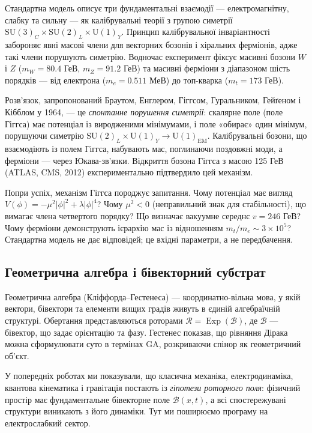 \documentclass[11pt,a4paper]{article}
\newcommand{\Exp}{\operatorname{Exp}}
\newcommand{\Rotor}{\mathcal{R}}
\newcommand{\Biv}{\mathcal{B}}
\newcommand{\SU}{\mathrm{SU}}
\newcommand{\UU}{\mathrm{U}}
\theoremstyle{definition}
\theoremstyle{plain}
\theoremstyle{remark}
\begin{document}
Стандартна модель описує три фундаментальні взаємодії — електромагнітну, слабку та сильну — як калібрувальні теорії з групою симетрії $\SU(3)_C \times \SU(2)_L \times \UU(1)_Y$. Принцип калібрувальної інваріантності забороняє явні масові члени для векторних бозонів і хіральних ферміонів, адже такі члени порушують симетрію. Водночас експеримент фіксує масивні бозони $W$ і $Z$ ($m_W = 80{.}4$ ГеВ, $m_Z = 91{.}2$ ГеВ) та масивні ферміони з діапазоном шість порядків — від електрона ($m_e = 0{.}511$ МеВ) до топ-кварка ($m_t = 173$ ГеВ).

Розв’язок, запропонований Браутом, Енглером, Гіггсом, Гуральником, Гейґеном і Кібблом у 1964, — це \emph{спонтанне порушення симетрії}: скалярне поле (поле Гіггса) має потенціал із виродженими мінімумами, і поле «обирає» один мінімум, порушуючи симетрію $\SU(2)_L \times \UU(1)_Y \to \UU(1)_{\text{EM}}$. Калібрувальні бозони, що взаємодіють із полем Гіггса, набувають мас, поглинаючи поздовжні моди, а ферміони — через Юкава-зв’язки. Відкриття бозона Гіггса з масою 125 ГеВ (ATLAS, CMS, 2012) експериментально підтвердило цей механізм.

Попри успіх, механізм Гіггса породжує запитання. Чому потенціал має вигляд $V(\phi) = -\mu^2|\phi|^2 + \lambda|\phi|^4$? Чому $\mu^2 < 0$ (неправильний знак для стабільності), що вимагає члена четвертого порядку? Що визначає вакуумне середнє $v = 246$ ГеВ? Чому ферміони демонструють ієрархію мас із відношенням $m_t/m_e \sim 3\times 10^5$? Стандартна модель не дає відповідей; це вхідні параметри, а не передбачення.

\subsection{Геометрична алгебра і бівекторний субстрат}

Геометрична алгебра (Кліффорда–Гестенеса) — координатно-вільна мова, у якій вектори, бівектори та елементи вищих градів живуть в єдиній алгебраїчній структурі. Обертання представляються роторами $\Rotor = \Exp(\Biv)$, де $\Biv$ — бівектор, що задає орієнтацію та фазу. Гестенес показав, що рівняння Дірака можна сформулювати суто в термінах GA, розкриваючи спінор як геометричний об’єкт.

У попередніх роботах ми показували, що класична механіка, електродинаміка, квантова кінематика і гравітація постають із \emph{гіпотези роторного поля}: фізичний простір має фундаментальне бівекторне поле $\Biv(x,t)$, а всі спостережувані структури виникають з його динаміки. Тут ми поширюємо програму на електрослабкий сектор.
\end{document}
